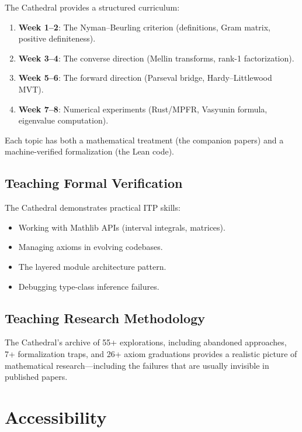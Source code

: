 \documentclass[11pt,a4paper]{article}
\begin{document}
The Cathedral provides a structured curriculum:
\begin{enumerate}
  \item \textbf{Week 1--2}: The Nyman--Beurling criterion
    (definitions, Gram matrix, positive definiteness).
  \item \textbf{Week 3--4}: The converse direction
    (Mellin transforms, rank-1 factorization).
  \item \textbf{Week 5--6}: The forward direction
    (Parseval bridge, Hardy--Littlewood MVT).
  \item \textbf{Week 7--8}: Numerical experiments
    (Rust/MPFR, Vasyunin formula, eigenvalue computation).
\end{enumerate}

Each topic has both a mathematical treatment (the companion papers)
and a machine-verified formalization (the Lean code).

\subsection{Teaching Formal Verification}

The Cathedral demonstrates practical ITP skills:
\begin{itemize}
  \item Working with Mathlib APIs (interval integrals, matrices).
  \item Managing axioms in evolving codebases.
  \item The layered module architecture pattern.
  \item Debugging type-class inference failures.
\end{itemize}

\subsection{Teaching Research Methodology}

The Cathedral's archive of 55+ explorations, including abandoned approaches,
7+ formalization traps, and 26+ axiom graduations provides a realistic
picture of mathematical research---including the failures that are
usually invisible in published papers.

\section{Accessibility}
\end{document}
